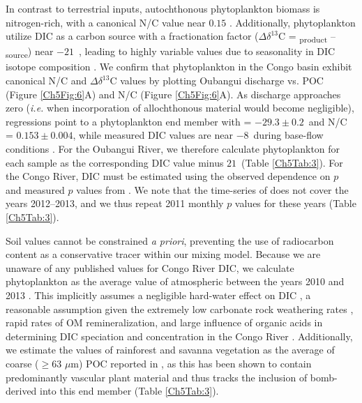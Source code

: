 In contrast to terrestrial inputs, autochthonous phytoplankton biomass is nitrogen-rich, with a canonical N/C value near $0.15$ \citep{Anderson:1994vb}. Additionally, phytoplankton utilize DIC as a carbon source with a fractionation factor ($\Delta\delta^{13}$C = \textsubscript{product} -- \textsubscript{source}) near $-21$\textperthousand\ \citep{Rau:1989wr}, leading to highly variable  values due to seasonality in DIC isotope composition \citep{Bouillon:2014ko}. We confirm that phytoplankton in the Congo basin exhibit canonical N/C and $\Delta\delta^{13}$C values by plotting Oubangui discharge vs. POC  (Figure \ref{Ch5Fig:6}A) and N/C (Figure \ref{Ch5Fig:6}A). As discharge approaches zero (\textit{i.e.} when incorporation of allochthonous material would become negligible), regressions point to a phytoplankton end member with  = $-29.3 \pm 0.2$\textperthousand\ and N/C = $0.153 \pm 0.004$, while measured DIC  values are near $-8$\textperthousand\ during base-flow conditions \citep{Bouillon:2012cw}. For the Oubangui River, we therefore calculate phytoplankton  for each sample as the corresponding DIC  value minus $21$\textperthousand\ (Table \ref{Ch5Tab:3}). For the Congo River, DIC  must be estimated using the observed dependence on $p$ \citep{Bouillon:2014ko} and measured $p$ values from \citet{Wang:2013js}. We note that the time-series of \citet{Wang:2013js} does not cover the years 2012--2013, and we thus repeat 2011 monthly $p$ values for these years (Table \ref{Ch5Tab:3}).

Soil  values cannot be constrained \textit{a priori}, preventing the use of radiocarbon content as a conservative tracer within our mixing model. Because we are unaware of any published  values for Congo River DIC, we calculate phytoplankton  as the average value of atmospheric  between the years 2010 and 2013 \citep{Graven:2015he}. This implicitly assumes a negligible hard-water effect on DIC , a reasonable assumption given the extremely low carbonate rock weathering rates \citep[$0.017$ tC km\textsuperscript{-2} yr\textsuperscript{-1};][]{Copard:2007bf}, rapid rates of OM remineralization, and large influence of organic acids in determining DIC speciation and concentration in the Congo River \citep{Wang:2013js}. Additionally, we estimate the  values of rainforest and savanna vegetation as the average of coarse ($\geq 63$ $\mu$m) POC reported in \citet{Spencer:2012en}, as this has been shown to contain predominantly vascular plant material and thus tracks the inclusion of bomb-derived  into this end member (Table \ref{Ch5Tab:3}).

